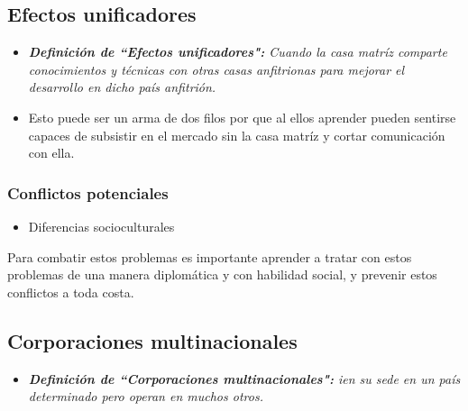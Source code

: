 \documentclass{article}
\begin{document}
\subsection{Efectos unificadores}
\begin{itemize}
    \item \emph{\textbf{Definición de ``Efectos unificadores":} Cuando la casa matríz comparte conocimientos y técnicas con otras casas anfitrionas para mejorar el desarrollo en dicho país anfitrión.}
    \item Esto puede ser un arma de dos filos por que al ellos aprender pueden sentirse capaces de subsistir en el mercado sin la casa matríz y cortar comunicación con ella.
\end{itemize}

\subsubsection{Conflictos potenciales}
\begin{itemize}
    \item Diferencias socioculturales
\end{itemize}

Para combatir estos problemas es importante aprender a tratar con estos problemas de una manera diplomática y con habilidad social, y prevenir estos conflictos a toda costa.



\subsection{Corporaciones multinacionales}
\begin{itemize}
    \item \emph{\textbf{Definición de ``Corporaciones multinacionales":} ien su sede en un país determinado pero operan en muchos otros.}
\end{itemize}

\end{document}

